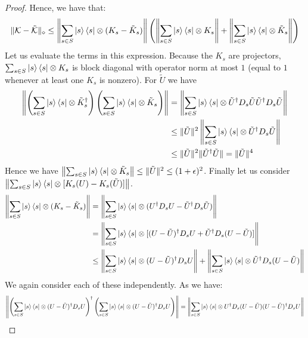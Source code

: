 \documentclass[aps,floatfix,10pt,amssymb,amsfont,amsmath,superscriptaddress,float,nofootinbib,longbibliography,nobalancelastpage,twocolumn]{revtex4-2}
\begin{document}
\begin{widetext}
\begin{proof}
Hence, we have that:
\begin{equation}
    \|\mathcal{K} - \tilde{\mathcal{K}}\|_{\diamond} \leq \left\|\sum_{s\in S}\ket{s}\bra{s}\otimes(K_s-\tilde K_s)\right\|\left(\left\|\sum_{s\in S}\ket{s}\bra{s}\otimes K_s \right\|+\left\|\sum_{s\in S}\ket{s}\bra{s}\otimes \tilde K_s \right\|\right)
\end{equation}
Let us evaluate the terms in this expression. Because the $K_s$ are projectors, $\sum_{s\in S}\ket{s}\bra{s}\otimes K_s$ is block diagonal with operator norm at most $1$ (equal to $1$ whenever at least one $K_s$ is nonzero). For $\tilde U$ we have
\begin{align}
    \left\|\left(\sum_{s\in S}\ket{s}\bra{s}\otimes \tilde K_s^{\dagger} \right)\left(\sum_{s\in S}\ket{s}\bra{s}\otimes \tilde K_s \right)\right\| &= \left\|\sum_{s\in S} \ket{s}\bra{s}\otimes\tilde U^{\dagger} D_s \tilde U\tilde U^{\dagger}  D_s \tilde U\right\| \\
     &\leq \|\tilde U\|^2\left\|\sum_{s\in S} \ket{s}\bra{s}\otimes\tilde U^{\dagger} D_s  \tilde U\right\|\\
     &\leq \|\tilde U\|^2 \|\tilde U^{\dagger}  \tilde U\|= \|\tilde U\|^4\\
\end{align}
Hence we have $\left\|\sum_{s\in S}\ket{s}\bra{s}\otimes \tilde K_s \right\| \leq \|\tilde U\|^2 \leq (1+\epsilon)^2$. Finally let us consider $\left\|\sum_{s\in S}\ket{s}\bra{s}\otimes[K_s(U)-K_s(\tilde U)]\right\|$.
\begin{align}
    \left\|\sum_{s\in S}\ket{s}\bra{s}\otimes(K_s-\tilde K_s)\right\| &= \left\|\sum_{s\in S}\ket{s}\bra{s}\otimes( U^{\dagger}  D_s U-\tilde U^{\dagger}  D_s \tilde U)\right\|\\
    &= \left\|\sum_{s\in S}\ket{s}\bra{s}\otimes[ (U-\tilde U)^{\dagger}  D_s U+\tilde U^{\dagger}  D_s (U-\tilde U)]\right\|\\
    &\leq \left\|\sum_{s\in S}\ket{s}\bra{s}\otimes (U-\tilde U)^{\dagger}  D_s U\right\|+\left\|\sum_{s\in S}\ket{s}\bra{s}\otimes\tilde U^{\dagger}  D_s (U-\tilde U)\right\|
\end{align}
We again consider each of these independently. As we have:
\begin{align}
   \left\| \left(\sum_{s\in S}\ket{s}\bra{s}\otimes (U-\tilde U)^{\dagger}  D_s U\right)^{\dagger} \left(\sum_{s\in S}\ket{s}\bra{s}\otimes (U-\tilde U)^{\dagger}  D_s U\right)\right\| &= \left\|\sum_{s\in S}\ket{s}\bra{s}\otimes U^{\dagger}D_s (U-\tilde U)(U-\tilde U)^{\dagger}D_s U\right\|\\

\end{align}
\end{proof}
\end{widetext}
\end{document}

